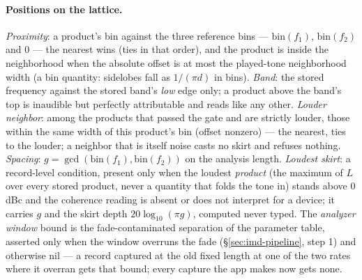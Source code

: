 \documentclass[11pt,a4paper]{article}
\begin{document}
\paragraph{Positions on the lattice.}
\emph{Proximity}: a product's bin against the three reference bins ---
$\mathrm{bin}(f_1)$, $\mathrm{bin}(f_2)$ and $0$ --- the nearest wins
(ties in that order), and the product is inside the neighborhood when the
absolute offset is at most the played-tone neighborhood width (a bin
quantity: sidelobes fall as $1/(\pi d)$ in bins). \emph{Band}: the stored
frequency against the stored band's \emph{low} edge only; a product above
the band's top is inaudible but perfectly attributable and reads like any
other. \emph{Louder neighbor}: among the products that passed the gate
and are strictly louder, those within the same width of this product's
bin (offset nonzero) --- the nearest, ties to the louder; a neighbor that
is itself noise casts no skirt and refuses nothing. \emph{Spacing}:
$g = \gcd(\mathrm{bin}(f_1), \mathrm{bin}(f_2))$ on the analysis length.
\emph{Loudest skirt}: a record-level condition, present only when the
loudest \emph{product} (the maximum of $L$ over every stored product,
never a quantity that folds the tone in) stands above $0$ dBc and the
coherence reading is absent or does not interpret for a device; it carries
$g$ and the skirt depth $20\log_{10}(\pi g)$, computed never typed. The
\emph{analyzer window} bound is the fade-contaminated separation of the
parameter table, asserted only when the window overruns the fade
(\S\ref{sec:imd-pipeline}, step 1) and otherwise nil --- a record captured
at the old fixed length at one of the two rates where it overran gets that
bound; every capture the app makes now gets none.
\end{document}
